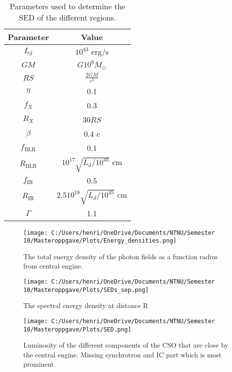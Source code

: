 \begin{table}
    \centering
    \begin{tabular}{|c|c|}
        \hline
        Parameter & Value \\
        \hline
        $L_{d}$ & $10^{43}$ erg/s \\
        $GM$ & $G 10^{8} M_{\odot}$ \\
        $RS$ & $\frac{2GM}{c^2}$ \\
        $\eta$ & 0.1 \\
        $f_{X}$ & 0.3 \\
        $R_{X}$ & 30$ RS $\\
        $\beta$ & 0.4 $c$\\
        $f_{\text{BLR}}$ & 0.1 \\
        $R_{\text{BLR}}$ & $10^{17} \sqrt{L_{d}/10^{45}}$ cm \\
        $f_{\text{IR}}$ & 0.5 \\
        $R_{\text{IR}}$ & $2.5 10^{18}\sqrt{L_{d}/10^{45}}$ cm \\
        $\Gamma$ & 1.1 \\
        \hline
    \end{tabular}
    \caption{Parameters used to determine the SED of the different regions.}
    \label{tab:SED_params}
\end{table}
\begin{figure}
    \centering
    \texttt{[image: C:/Users/henri/OneDrive/Documents/NTNU/Semester 10/Masteroppgave/Plots/Energy\_densities.png]}
    \caption{The total energy density of the photon fields as a function radius from central engine.}
    \label{fig:photon_fields}
\end{figure}


\begin{figure}
    \centering
    \texttt{[image: C:/Users/henri/OneDrive/Documents/NTNU/Semester 10/Masteroppgave/Plots/SEDs\_sep.png]}
    \caption{The spectral energy density at distance R}
    \label{fig:SED_sep}
\end{figure}

\begin{figure}
    \centering
    \texttt{[image: C:/Users/henri/OneDrive/Documents/NTNU/Semester 10/Masteroppgave/Plots/SED.png]}
    \caption{Luminosity of the different components of the CSO that are close by the central engine. Missing synchrotron and IC part which is most prominent }
    \label{fig:Lum_SED}
\end{figure}

